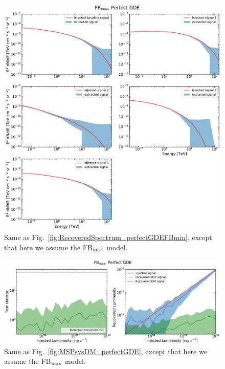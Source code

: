 \documentclass[doublespace,draft,nopageskip]{VTthesis} %
\begin{document}
\begin{figure}
    \begin{center}
    \includegraphics[scale = 0.48]{Figures/CTA/all-signal-spectra-mis-False-Fermi-min-False.pdf}
    \caption{Same as Fig.~\ref{fig:RecoveredSpectrum_perfectGDEFBmin}, except that here we assume the FB$_{\rm max}$ model. }\label{fig:RecoveredSpectrum_perfectGDEFBmax}
    \end{center}
    \end{figure}

\begin{figure}
    \begin{center}
    \includegraphics[scale = 0.48]{Figures/CTA/TS-dm-mis-False-Fermi-min-False.pdf}
\caption{Same as Fig.~\ref{fig:MSPsvsDM_perfectGDE}, except that here we assume the FB$_{\rm max}$ model.}\label{fig:MSPsvsDM_perfectGDEFBmax}
    \end{center}
\end{figure}
\end{document}
